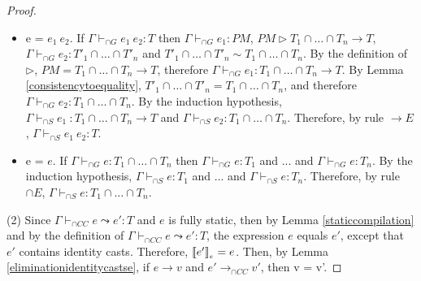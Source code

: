 \documentclass[a4paper]{article}
\begin{document}
\begin{proof}
\begin{itemize}
\begin{itemize}
    \end{itemize}
    \item e = $e_1\ e_2$.
    If $\Gamma \vdash_{\cap G} e_1\ e_2 : T$ then $\Gamma \vdash_{\cap G} e_1 : PM$, $PM \rhd T_1 \cap \ldots \cap T_n \rightarrow T$, $\Gamma \vdash_{\cap G} e_2 : T'_1 \cap \ldots \cap T'_n$ and $T'_1 \cap \ldots \cap T'_n \sim T_1 \cap \ldots \cap T_n$.
    By the definition of $\rhd$, $PM = T_1 \cap \ldots \cap T_n \rightarrow T$, therefore $\Gamma \vdash_{\cap G} e_1 : T_1 \cap \ldots \cap T_n \rightarrow T$.
    By Lemma \ref{consistencytoequality}, $T'_1 \cap \ldots \cap T'_n = T_1 \cap \ldots \cap T_n$, and therefore $\Gamma \vdash_{\cap G} e_2 : T_1 \cap \ldots \cap T_n$.
    By the induction hypothesis, $\Gamma \vdash_{\cap S} e_1\ : T_1 \cap \ldots \cap T_n \rightarrow T$ and $\Gamma \vdash_{\cap S} e_2 : T_1 \cap \ldots \cap T_n$.
    Therefore, by rule ${\rightarrow} E$, $\Gamma \vdash_{\cap S} e_1\ e_2 : T$.
    \item e = $e$.
    If $\Gamma \vdash_{\cap G} e : T_1 \cap \ldots \cap T_n$ then $\Gamma \vdash_{\cap G} e : T_1$ and ... and $\Gamma \vdash_{\cap G} e : T_n$.
    By the induction hypothesis, $\Gamma \vdash_{\cap S} e : T_1$ and ... and $\Gamma \vdash_{\cap S} e : T_n$.
    Therefore, by rule ${\cap} E$, $\Gamma \vdash_{\cap S} e : T_1 \cap \ldots \cap T_n$.\\
\end{itemize}
(2) Since $\Gamma \vdash_{\cap CC} e \leadsto e' : T$ and $e$ is fully static, then by Lemma \ref{staticcompilation} and by the definition of $\Gamma \vdash_{\cap CC} e \leadsto e' : T$, the expression $e$ equals $e'$, except that $e'$ contains identity casts.
Therefore, $\llbracket e' \rrbracket_{_e} = e$.
Then, by Lemma \ref{eliminationidentitycastse}, if $e \longrightarrow v$ and $e' \longrightarrow_{\cap CC} v'$, then v = v'.
\end{proof}
\end{document}

